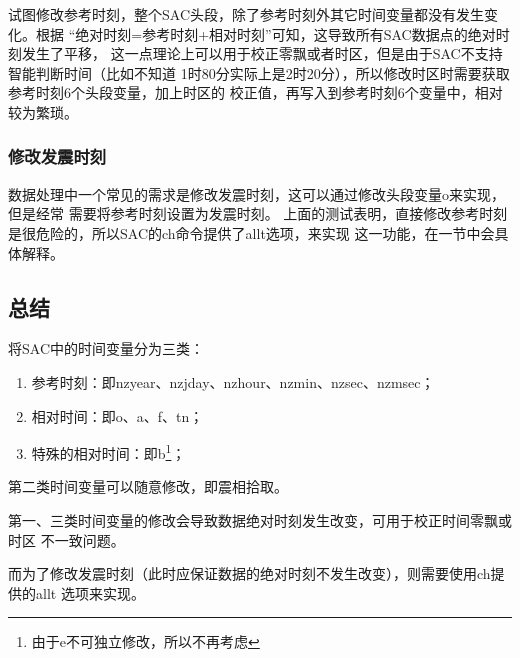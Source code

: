试图修改参考时刻，整个SAC头段，除了参考时刻外其它时间变量都没有发生变化。根据
``绝对时刻=参考时刻+相对时刻''可知，这导致所有SAC数据点的绝对时刻发生了平移，
这一点理论上可以用于校正零飘或者时区，但是由于SAC不支持智能判断时间（比如不知道
1时80分实际上是2时20分），所以修改时区时需要获取参考时刻6个头段变量，加上时区的
校正值，再写入到参考时刻6个变量中，相对较为繁琐。

\subsubsection{修改发震时刻}
数据处理中一个常见的需求是修改发震时刻，这可以通过修改头段变量o来实现，但是经常
需要将参考时刻设置为发震时刻。
上面的测试表明，直接修改参考时刻是很危险的，所以SAC的ch命令提供了allt选项，来实现
这一功能，在一节中会具体解释。

\subsection{总结}
将SAC中的时间变量分为三类：
\begin{enumerate}
\item 参考时刻：即nzyear、nzjday、nzhour、nzmin、nzsec、nzmsec；
\item 相对时间：即o、a、f、tn；
\item 特殊的相对时间：即b\footnote{由于e不可独立修改，所以不再考虑}；
\end{enumerate}

第二类时间变量可以随意修改，即震相拾取。

第一、三类时间变量的修改会导致数据绝对时刻发生改变，可用于校正时间零飘或时区
不一致问题。

而为了修改发震时刻（此时应保证数据的绝对时刻不发生改变），则需要使用ch提供的allt
选项来实现。
